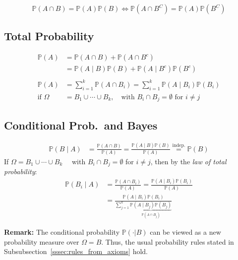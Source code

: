\noindent\begin{equation*}
    \mathbb{P}(A\cap B) = \mathbb{P}(A)\mathbb{P}(B) \Leftrightarrow \mathbb{P}(A\cap B^C) = \mathbb{P}(A)\mathbb{P}(B^C)
\end{equation*}

\subsection{Total Probability}
\noindent\begin{align*}
    \mathbb{P}(A)     & =\mathbb{P}(A\cap B)+\mathbb{P}(A\cap B^c)                                           \\
                      & =\mathbb{P}(A\mid B)\mathbb{P}(B)+\mathbb{P}(A\mid B^c)\mathbb{P}(B^c)               \\\\
    \mathbb{P}(A)     & =\sum_{i=1}^k\mathbb{P}(A\cap B_i) =\sum_{i=1}^k\mathbb{P}(A\mid B_i)\mathbb{P}(B_i) \\
    \text{if } \Omega & =B_1\cup\cdots\cup B_k,\quad\text{with }B_i\cap B_j=\emptyset\text{ for }i\neq j
\end{align*}
\subsection{Conditional Prob.\ and Bayes}
\noindent\begin{align*}
    \mathbb{P}(B\mid A) & =\frac{\mathbb{P}(A\cap B)}{\mathbb{P}(A)}=\frac{\mathbb{P}(A\mid B)\mathbb{P}(B)}{\mathbb{P}(A)} \overset{\text{indep.}}{=} \mathbb{P}(B)
\end{align*}
If $\Omega=B_1\cup\cdots\cup B_k\quad$ with $B_i\cap B_j=\emptyset$ for $i\neq j$, then by the \textit{law of total probability}:
\noindent\begin{align*}
    \mathbb{P}(B_i\mid A) & =\frac{\mathbb{P}(A\cap B_i)}{\mathbb{P}(A)}=\frac{\mathbb{P}(A\mid B_i)\mathbb{P}(B_i)}{\mathbb{P}(A)}                              \\
                          & =\frac{\mathbb{P}(A\mid B_i)\mathbb{P}(B_i)}{\sum_{j=1}^k \underbrace{\mathbb{P}(A\mid B_j)\mathbb{P}(B_j)}_{\mathbb{P}(A\cap B_j)}}
\end{align*}

\textbf{Remark:} The conditional probability $\mathbb{P}(\cdot|B)$ can be viewed as a new probability measure over $\Omega=B$. Thus, the usual probability rules stated in Subsubsection\ \ref{sssec:rules_from_axioms} hold.

